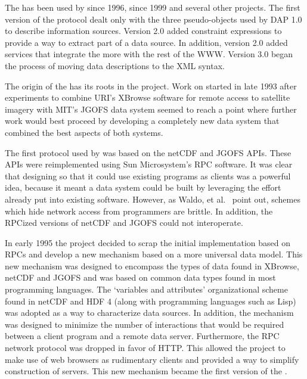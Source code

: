 \documentclass[justify]{dods-paper}
\begin{document}
The \DAP has been used by \DODS since 1996, \NVODS since 1999 and
several other projects. The first version of the protocol dealt only
with the three pseudo-objects used by DAP 1.0 to describe information
sources. Version 2.0 added constraint expressions to provide a way to
extract part of a data source. In addition, version 2.0 added services
that integrate the \DAP more with the rest of the \ac{WWW}.  
Version 3.0 began the process of moving data descriptions to the XML
syntax. 


The origin of the \DAP has its roots in the \DODS project. Work on
\DODS started in late 1993 after experiments to combine URI's XBrowse
software for remote access to satellite imagery with MIT's JGOFS data system
seemed to reach a point where further work would best proceed by developing a
completely new data system that combined the best aspects of both systems.


The first protocol used by \DODS was based on the netCDF and JGOFS APIs.
These APIs were reimplemented using Sun Microsystem's \ac{RPC} software. It
was clear that designing \DODS so that it could use existing programs as
clients was a powerful idea, because it meant a data system could be built
by leveraging the effort already put into existing software. However, as
Waldo, et al.~\cite{waldo:dist-comp} point out, schemes which hide network
access from programmers are brittle. In addition, the RPCized versions of
netCDF and JGOFS could not interoperate.


In early 1995 the \DODS project decided to scrap the initial
implementation based on \ac{RPC}s and develop a new mechanism based on
a more universal data model. This new mechanism was designed to
encompass the types of data found in XBrowse, netCDF and JGOFS and was
based on common data types found in most programming languages. The
`variables and attributes' organizational scheme found in netCDF and
HDF 4 (along with programming languages such as Lisp) was adopted as a
way to characterize data sources. In addition, the mechanism was
designed to minimize the number of interactions that would be required
between a client program and a remote data server.  Furthermore, the
\ac{RPC} network protocol was dropped in favor of \ac{HTTP}.  This
allowed the \DODS project to make use of web browsers as rudimentary
clients and provided a way to simplify construction of \DAP servers.
This new mechanism became the first version of the \DAP.
\end{document}
